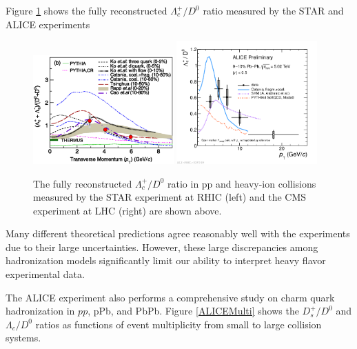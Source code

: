 Figure \ref{HadroPlotCharm} shows the fully reconstructed $\Lambda_c^+/D^0$ ratio measured by the STAR and ALICE experiments



\begin{figure}[hbtp]
\begin{center}
\includegraphics[width=0.48\textwidth]{Figures/Chapter2/STARLambdaCD0.png}
\includegraphics[width=0.48\textwidth]{Figures/Chapter2/ALICELambdaCD0}
\caption{The fully reconstructed $\Lambda_c^+/D^0$ ratio in pp and heavy-ion collisions measured by the STAR experiment at RHIC (left) and the CMS experiment at LHC (right) are shown above.}
\label{HadroPlotCharm}
\end{center}
\end{figure}   



Many different theoretical predictions agree reasonably well with the experiments due to their large uncertainties. However, these large discrepancies among hadronization models significantly limit our ability to interpret heavy flavor experimental data. 

The ALICE experiment also performs a comprehensive study on charm quark hadronization in $pp$, pPb, and PbPb. Figure \ref{ALICEMulti} shows the $D^+_s/D^0$ and $\Lambda_c/D^0$ ratios as functions of event multiplicity from small to large collision systems. 

